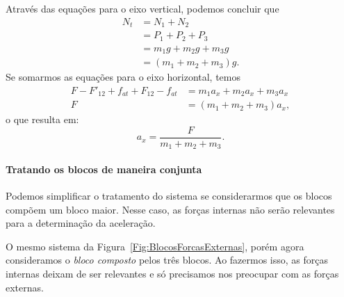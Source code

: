 \noindent{}Através das equações para o eixo vertical, podemos concluir que
\begin{align}
    N_t &= N_1 + N_2 \\
    &= P_1 + P_2 + P_3\\
    &= m_1g + m_2g + m_3g\\
    &= (m_1 + m_2 + m_3)g.
\end{align}
%
Se somarmos as equações para o eixo horizontal, temos
\begin{align}
    F - F'_{12} + f_{at} + F_{12} - f_{at} &= m_1 a_x + m_2 a_x + m_3 a_x \\
    F &= (m_1 + m_2 + m_3) a_x,
\end{align}
%
o que resulta em:
\begin{equation}
    a_x = \frac{F}{m_1 + m_2 + m_3}.
\end{equation}

\paragraph{Tratando os blocos de maneira conjunta}

Podemos simplificar o tratamento do sistema se considerarmos que os blocos compõem um bloco maior. Nesse caso, as forças internas não serão relevantes para a determinação da aceleração.

\begin{marginfigure}
\centering
{}
\caption{O mesmo sistema da Figura~\ref{Fig:BlocosForcasExternas}, porém agora consideramos o \emph{bloco composto} pelos três blocos. Ao fazermos isso, as forças internas deixam de ser relevantes e só precisamos nos preocupar com as forças externas.\label{Fig:BlocosForcasExternasComposto}}
\end{marginfigure}

